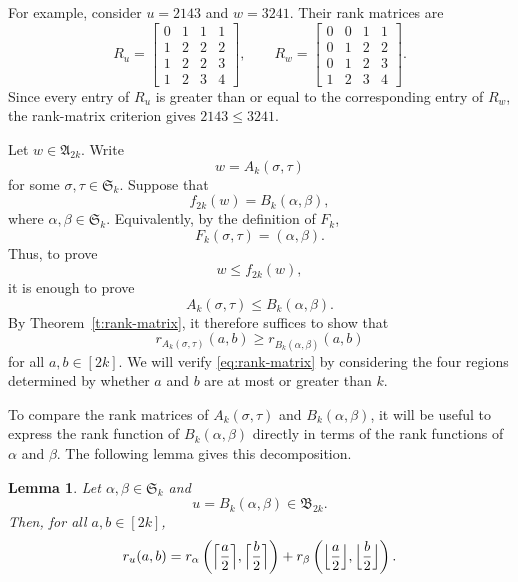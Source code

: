 \documentclass[12pt]{amsart}
\DeclarePairedDelimiter\ceil{\lceil}{\rceil}
\DeclarePairedDelimiter\floor{\lfloor}{\rfloor}
\newtheorem{lem}[thm]{Lemma}
\theoremstyle{definition}
\numberwithin{equation}{section}
\begin{document}
For example, consider $u=2143$ and $w=3241$. Their rank matrices are
\begin{equation*}
R_u=
\begin{bmatrix}
0&1&1&1\\
1&2&2&2\\
1&2&2&3\\
1&2&3&4
\end{bmatrix},
\qquad
R_w=
\begin{bmatrix}
0&0&1&1\\
0&1&2&2\\
0&1&2&3\\
1&2&3&4
\end{bmatrix}.
\end{equation*}
Since every entry of $R_u$ is greater than or equal to the
corresponding entry of $R_w$, the rank-matrix criterion gives
$2143\leq 3241$.

Let $w\in\mathfrak{A}_{2k}$. Write
\begin{equation*}
w=A_k(\sigma,\tau)
\end{equation*}
for some $\sigma,\tau\in\mathfrak{S}_k$. Suppose that
\begin{equation*}
f_{2k}(w)=B_k(\alpha,\beta),
\end{equation*}
where $\alpha,\beta\in\mathfrak{S}_k$. Equivalently, by the definition
of $F_k$,
\begin{equation*}
F_k(\sigma,\tau)=(\alpha,\beta).
\end{equation*}
Thus, to prove
\begin{equation*}
w\leq f_{2k}(w),
\end{equation*}
it is enough to prove
\begin{equation*}
A_k(\sigma,\tau)\leq B_k(\alpha,\beta).
\end{equation*}
By Theorem~\ref{t:rank-matrix}, it therefore suffices to
show that
\begin{equation}\label{eq:rank-matrix}
r_{A_k(\sigma,\tau)}(a,b)
\geq
r_{B_k(\alpha,\beta)}(a,b)
\end{equation}
for all $a,b\in[2k]$.
We will verify \eqref{eq:rank-matrix} by considering the four regions determined
by whether $a$ and $b$ are at most or greater than $k$.

To compare the rank matrices of $A_k(\sigma,\tau)$ and
$B_k(\alpha,\beta)$, it will be useful to express the rank function of
$B_k(\alpha,\beta)$ directly in terms of the rank functions of
$\alpha$ and $\beta$. The following lemma gives this decomposition.

\begin{lem}\label{l:rank B}
Let $\alpha,\beta\in\mathfrak S_k$ and
\begin{equation*}
u=B_k(\alpha,\beta)\in\mathfrak B_{2k}.
\end{equation*}
Then, for all $a,b\in[2k]$,
\begin{equation*}
r_u(a,b)
=
r_\alpha\left(
\ceil[\Big]{\frac{a}{2}},
\ceil[\Big]{\frac{b}{2}}
\right)
+
r_\beta\left(
\floor[\Big]{\frac{a}{2}},
\floor[\Big]{\frac{b}{2}}
\right).
\end{equation*}
\end{lem}
\end{document}
